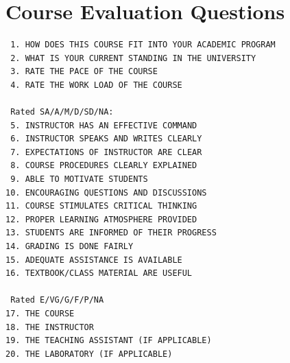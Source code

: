 \documentclass[12pt]{article}
\begin{document}
\appendix

\section{Course Evaluation Questions}
\begin{verbatim}
 1. HOW DOES THIS COURSE FIT INTO YOUR ACADEMIC PROGRAM
 2. WHAT IS YOUR CURRENT STANDING IN THE UNIVERSITY
 3. RATE THE PACE OF THE COURSE 
 4. RATE THE WORK LOAD OF THE COURSE
 
 Rated SA/A/M/D/SD/NA:
 5. INSTRUCTOR HAS AN EFFECTIVE COMMAND
 6. INSTRUCTOR SPEAKS AND WRITES CLEARLY
 7. EXPECTATIONS OF INSTRUCTOR ARE CLEAR
 8. COURSE PROCEDURES CLEARLY EXPLAINED
 9. ABLE TO MOTIVATE STUDENTS
10. ENCOURAGING QUESTIONS AND DISCUSSIONS
11. COURSE STIMULATES CRITICAL THINKING
12. PROPER LEARNING ATMOSPHERE PROVIDED
13. STUDENTS ARE INFORMED OF THEIR PROGRESS
14. GRADING IS DONE FAIRLY
15. ADEQUATE ASSISTANCE IS AVAILABLE
16. TEXTBOOK/CLASS MATERIAL ARE USEFUL

 Rated E/VG/G/F/P/NA
17. THE COURSE
18. THE INSTRUCTOR
19. THE TEACHING ASSISTANT (IF APPLICABLE)
20. THE LABORATORY (IF APPLICABLE)
\end{verbatim}
\end{document}
